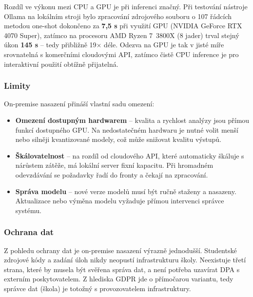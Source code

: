 Rozdíl ve výkonu mezi CPU a GPU je při inferenci značný.
Při testování nástroje Ollama na lokálním stroji bylo zpracování zdrojového souboru o 107 řádcích metodou one-shot dokončeno za \textbf{7,5 s} při využití GPU (NVIDIA GeForce RTX 4070 Super), zatímco na procesoru AMD Ryzen 7~3800X (8 jader) trval stejný úkon \textbf{145 s} -- tedy přibližně 19$\times$ déle.
Odezva na GPU je tak v jisté míře srovnatelná s komerčními cloudovými API, zatímco čistě CPU inference je pro interaktivní použití obtížně přijatelná.

\subsubsection*{Limity}
\label{subsubsec:deployment-on-premise-limits}

On-premise nasazení přináší vlastní sadu omezení:

\begin{itemize}
    \item \textbf{Omezení dostupným hardwarem} -- kvalita a rychlost analýzy jsou přímou funkcí dostupného GPU\@.
    Na nedostatečném hardwaru je nutné volit menší nebo silněji kvantizované modely, což může snižovat kvalitu výstupů.

    \item \textbf{Škálovatelnost} -- na rozdíl od cloudového API, které automaticky škáluje s nárůstem zátěže, má lokální server fixní kapacitu.
    Při hromadném odevzdávání se požadavky řadí do fronty a čekají na zpracování.

    \item \textbf{Správa modelu} -- nové verze modelů musí být ručně staženy a nasazeny.
    Aktualizace nebo výměna modelu vyžaduje přímou intervenci správce systému.
\end{itemize}

\subsubsection*{Ochrana dat}
\label{subsubsec:deployment-on-premise-data-protection}

Z pohledu ochrany dat je on-premise nasazení výrazně jednodušší.
Studentské zdrojové kódy a zadání úloh nikdy neopustí infrastrukturu školy.
Neexistuje třetí strana, které by musela být svěřena správa dat, a není potřeba uzavírat DPA s externím poskytovatelem.
Z hlediska GDPR jde o přímočarou variantu, tedy správce dat (škola) je totožný s provozovatelem infrastruktury.

